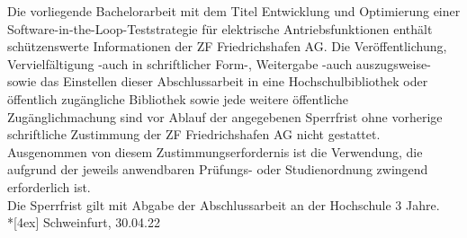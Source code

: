 Die vorliegende Bachelorarbeit mit dem Titel \glqq Entwicklung und Optimierung einer Software-in-the-Loop-Teststrategie für elektrische Antriebsfunktionen\grqq{} 
enthält schützenswerte Informationen der ZF Friedrichshafen AG. Die Veröffentlichung, Vervielfältigung -auch in schriftlicher Form-, Weitergabe -auch auszugsweise- 
sowie das Einstellen dieser Abschlussarbeit in eine Hochschulbibliothek oder öffentlich zugängliche Bibliothek sowie jede weitere öffentliche 
Zugänglichmachung sind vor Ablauf der angegebenen Sperrfrist ohne vorherige schriftliche Zustimmung der ZF Friedrichshafen AG nicht gestattet. Ausgenommen 
von diesem Zustimmungserfordernis ist die Verwendung, die aufgrund der jeweils anwendbaren Prüfungs- oder Studienordnung 
zwingend erforderlich ist.\\
Die Sperrfrist gilt mit Abgabe der Abschlussarbeit an der Hochschule 3 Jahre.\\*[4ex]
Schweinfurt, 30.04.22
